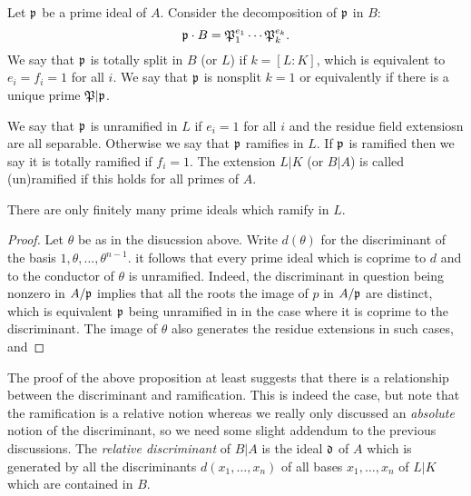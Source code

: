\begin{definition}
  Let $\mathfrak{p}$ be a prime ideal of $A$.
  Consider the decomposition of $\mathfrak{p}$ in $B$:
  \[ \mathfrak{p} \cdot B = \mathfrak{P}_{1}^{e_{1}} \cdots \mathfrak{P}_{k}^{e_{k}}. \]
  We say that $\mathfrak{p}$ is totally split in $B$ (or $L$) if $k = [L:K]$, which is equivalent to $e_{i} = f_{i} = 1$ for all $i$.
  We say that $\mathfrak{p}$ is nonsplit $k = 1$ or equivalently if there is a unique prime $\mathfrak{P}|\mathfrak{p}$.
\end{definition}

\begin{definition}
  We say that $\mathfrak{p}$ is unramified in $L$ if $e_{i} = 1$ for all $i$ and the residue field extensiosn are all separable.
  Otherwise we say that $\mathfrak{p}$ ramifies in $L$.
  If $\mathfrak{p}$ is ramified then we say it is totally ramified if $f_{i} = 1$.
  The extension $L|K$ (or $B|A$) is called (un)ramified if this holds for all primes of $A$.
\end{definition}

\begin{proposition}
  There are only finitely many prime ideals which ramify in $L$.
\end{proposition}
\begin{proof}
  Let $\theta$ be as in the disucssion above.
  Write $d(\theta)$ for the discriminant of the basis $1,\theta,\ldots,\theta^{n-1}$.
   it follows that every prime ideal which is coprime to $d$ and to the conductor of $\theta$ is unramified.
  Indeed, the discriminant in question being nonzero in $A/\mathfrak{p}$ implies that all the roots the image of $p$ in $A/\mathfrak{p}$ are distinct, which is equivalent $\mathfrak{p}$ being unramified in in the case where it is coprime to the discriminant.
  The image of $\theta$ also generates the residue extensions in such cases, and 
\end{proof}

The proof of the above proposition at least suggests that there is a relationship between the discriminant and ramification.
This is indeed the case, but note that the ramification is a relative notion whereas we really only discussed an \emph{absolute} notion of the discriminant, so we need some slight addendum to the previous discussions.
The \emph{relative discriminant} of $B|A$ is the ideal $\mathfrak{d}$ of $A$ which is generated by all the discriminants $d(x_{1},\ldots,x_{n})$ of all bases $x_{1},\ldots,x_{n}$ of $L|K$ which are contained in $B$.

